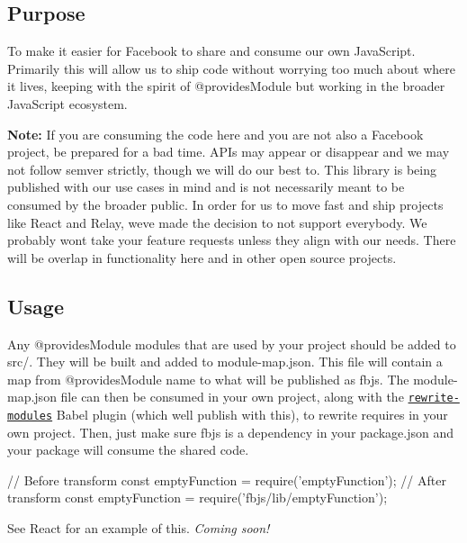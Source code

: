 \subsection*{Purpose}

To make it easier for Facebook to share and consume our own Java\+Script. Primarily this will allow us to ship code without worrying too much about where it lives, keeping with the spirit of {\ttfamily @provides\+Module} but working in the broader Java\+Script ecosystem.

{\bfseries Note\+:} If you are consuming the code here and you are not also a Facebook project, be prepared for a bad time. A\+P\+Is may appear or disappear and we may not follow semver strictly, though we will do our best to. This library is being published with our use cases in mind and is not necessarily meant to be consumed by the broader public. In order for us to move fast and ship projects like React and Relay, we\textquotesingle{}ve made the decision to not support everybody. We probably won\textquotesingle{}t take your feature requests unless they align with our needs. There will be overlap in functionality here and in other open source projects.

\subsection*{Usage}

Any {\ttfamily @provides\+Module} modules that are used by your project should be added to {\ttfamily src/}. They will be built and added to {\ttfamily module-\/map.\+json}. This file will contain a map from {\ttfamily @provides\+Module} name to what will be published as {\ttfamily fbjs}. The {\ttfamily module-\/map.\+json} file can then be consumed in your own project, along with the \href{https://github.com/facebook/fbjs/blob/master/babel-preset/plugins/rewrite-modules.js}{\tt rewrite-\/modules} Babel plugin (which we\textquotesingle{}ll publish with this), to rewrite requires in your own project. Then, just make sure {\ttfamily fbjs} is a dependency in your {\ttfamily package.\+json} and your package will consume the shared code.


\begin{DoxyCode}
// Before transform
const emptyFunction = require('emptyFunction');
// After transform
const emptyFunction = require('fbjs/lib/emptyFunction');
\end{DoxyCode}


See React for an example of this. {\itshape Coming soon!}

